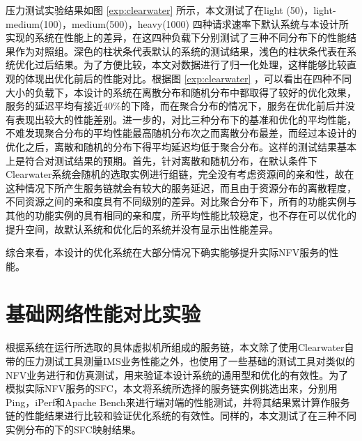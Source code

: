 压力测试实验结果如图 \ref{exp:clearwater} 所示，本文测试了在light (50)，light-medium(100)，medium(500)，heavy(1000) 四种请求速率下默认系统与本设计所实现的系统在性能上的差异，在这四种负载下分别测试了三种不同分布下的性能结果作为对照组。深色的柱状条代表默认的系统的测试结果，浅色的柱状条代表在系统优化过后结果。为了方便比较，本文对数据进行了归一化处理，这样能够比较直观的体现出优化前后的性能对比。根据图 \ref{exp:clearwater} ，可以看出在四种不同大小的负载下，本设计的系统在离散分布和随机分布中都取得了较好的优化效果，服务的延迟平均有接近40\%的下降，而在聚合分布的情况下，服务在优化前后并没有表现出较大的性能差别。进一步的，对比三种分布下的基准和优化的平均性能，不难发现聚合分布的平均性能最高随机分布次之而离散分布最差，而经过本设计的优化之后，离散和随机的分布下得平均延迟均低于聚合分布。这样的测试结果基本上是符合对测试结果的预期。首先，针对离散和随机分布，在默认条件下Clearwater系统会随机的选取实例进行组链，完全没有考虑资源间的亲和性，故在这种情况下所产生服务链就会有较大的服务延迟，而且由于资源分布的离散程度，不同资源之间的亲和度具有不同级别的差异。对比聚合分布下，所有的功能实例与其他的功能实例的具有相同的亲和度，所平均性能比较稳定，也不存在可以优化的提升空间，故默认系统和优化后的系统并没有显示出性能差异。

综合来看，本设计的优化系统在大部分情况下确实能够提升实际NFV服务的性能。

\section{基础网络性能对比实验}
根据系统在运行所选取的具体虚拟机所组成的服务链，本文除了使用Clearwater自带的压力测试工具测量IMS业务性能之外，也使用了一些基础的测试工具对类似的NFV业务进行和仿真测试，用来验证本设计系统的通用型和优化的有效性。为了模拟实际NFV服务的SFC，本文将系统所选择的服务链实例挑选出来，分别用Ping，iPerf和Apache Bench来进行端对端的性能测试，并将其结果累计算作服务链的性能结果进行比较和验证优化系统的有效性。同样的，本文测试了在三种不同实例分布的下的SFC映射结果。

